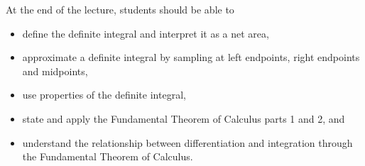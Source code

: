 \documentclass[../main]{subfiles}
\begin{document}
%
%
% 
%


%
%

  At the end of the lecture, students should be able to
  \begin{itemize}
    \item define the definite integral and interpret it as a net area,
    \item approximate a definite integral by sampling at left endpoints, right endpoints and midpoints,
    \item use properties of the definite integral,
    \item state and apply the Fundamental Theorem of Calculus parts 1 and 2, and
    \item understand the relationship between differentiation and integration through the Fundamental Theorem of Calculus.
  \end{itemize}




%
%
%
\end{document}
